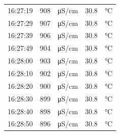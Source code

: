 \documentclass[11pt]{article}
\begin{document}
\begin{enumerate}
\begin{center}
\begin{tabular}{rrlrl}
16:27:19 & 908 & μS/cm & 30.8 & °C\\
16:27:29 & 907 & μS/cm & 30.8 & °C\\
16:27:39 & 906 & μS/cm & 30.8 & °C\\
16:27:49 & 904 & μS/cm & 30.8 & °C\\
16:28:00 & 903 & μS/cm & 30.8 & °C\\
16:28:10 & 902 & μS/cm & 30.8 & °C\\
16:28:20 & 900 & μS/cm & 30.8 & °C\\
16:28:30 & 899 & μS/cm & 30.8 & °C\\
16:28:40 & 898 & μS/cm & 30.8 & °C\\
16:28:50 & 896 & μS/cm & 30.8 & °C\\
\end{tabular}
\end{center}


\end{enumerate}
\end{document}
